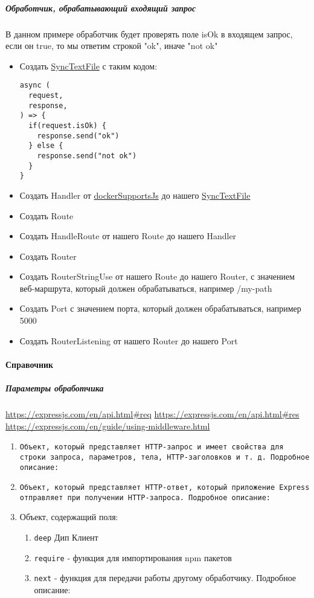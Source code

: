 \documentclass{article}
\begin{document}
\subparagraph{Обработчик, обрабатывающий входящий запрос}
В данном примере обработчик будет проверять поле isOk в входящем запрос, если
он true, то мы ответим строкой "ok", иначе "not ok"
\begin{itemize}
  \item Создать \hyperlink{SyncTextFile.Def}{SyncTextFile} с таким кодом:
        \begin{lstlisting}
async (
  request,
  response,
) => {
  if(request.isOk) {
    response.send("ok") 
  } else {
    response.send("not ok")
  }
}
\end{lstlisting}
  \item Создать Handler от \hyperlink{dockerSupportsJs.Def}{dockerSupportsJs}
        до нашего \hyperlink{SyncTextFile.Def}{SyncTextFile}
  \item Создать Route
  \item Создать HandleRoute от нашего Route до нашего Handler
  \item Создать Router
  \item Создать RouterStringUse от нашего Route до нашего Router, с значением
        веб-маршрута, который должен обрабатываться, например /my-path
  \item Создать Port с значением порта, который должен обрабатываться, например
        5000
  \item Создать RouterListening от нашего Router до нашего Port
\end{itemize}

\paragraph{Справочник}
\subparagraph{Параметры обработчика}

\urldef{\requrl}\url{https://expressjs.com/en/api.html#req}
\urldef{\resurl}\url{https://expressjs.com/en/api.html#res}
\urldef{\midwareurl}\url{https://expressjs.com/en/guide/using-middleware.html}

\begin{enumerate}
  \item \texttt{Объект, который представляет HTTP-запрос и имеет свойства для
          строки запроса, параметров, тела, HTTP-заголовков и т. д. Подробное
          описание:
          \requrl}
  \item \texttt{Объект, который представляет HTTP-ответ, который приложение
          Express отправляет при получении HTTP-запроса. Подробное описание:
          \resurl}
  \item Объект, содержащий поля:
        \begin{enumerate}
          \item \texttt{deep} Дип Клиент
          \item \texttt{require} - функция для импортирования npm пакетов
          \item \texttt{next} - функция для передачи работы другому
                обработчику. Подробное описание: \midwareurl
        \end{enumerate}
\end{enumerate}
\end{document}
